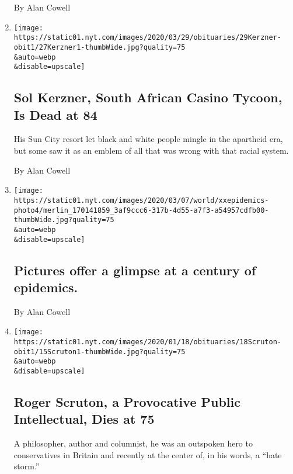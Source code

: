 \begin{enumerate}
  By Alan Cowell
\item
  \href{/2020/03/27/business/sol-kerzner-dead.html}{}

  \texttt{[image: https://static01.nyt.com/images/2020/03/29/obituaries/29Kerzner-obit1/27Kerzner1-thumbWide.jpg?quality=75\\\&auto=webp\\\&disable=upscale]}

  \hypertarget{sol-kerzner-south-african-casino-tycoon-is-dead-at-84}{%
  \subsection{Sol Kerzner, South African Casino Tycoon, Is Dead at
  84}\label{sol-kerzner-south-african-casino-tycoon-is-dead-at-84}}

  His Sun City resort let black and white people mingle in the apartheid
  era, but some saw it as an emblem of all that was wrong with that
  racial system.

  By Alan Cowell
\item
  \href{/live/2020/coronavirus-updates-news-03-23/pictures-offer-a-glimpse-at-a-century-of-epidemics}{}

  \texttt{[image: https://static01.nyt.com/images/2020/03/07/world/xxepidemics-photo4/merlin\_170141859\_3af9ccc6-317b-4d55-a7f3-a54957cdfb00-thumbWide.jpg?quality=75\\\&auto=webp\\\&disable=upscale]}

  \hypertarget{pictures-offer-a-glimpse-at-a-century-of-epidemics}{%
  \subsection{Pictures offer a glimpse at a century of
  epidemics.}\label{pictures-offer-a-glimpse-at-a-century-of-epidemics}}

  By Alan Cowell
\item
  \href{/2020/01/16/books/roger-scruton-dead.html}{}

  \texttt{[image: https://static01.nyt.com/images/2020/01/18/obituaries/18Scruton-obit1/15Scruton1-thumbWide.jpg?quality=75\\\&auto=webp\\\&disable=upscale]}

  \hypertarget{roger-scruton-a-provocative-public-intellectual-dies-at-75}{%
  \subsection{Roger Scruton, a Provocative Public Intellectual, Dies at
  75}\label{roger-scruton-a-provocative-public-intellectual-dies-at-75}}

  A philosopher, author and columnist, he was an outspoken hero to
  conservatives in Britain and recently at the center of, in his words,
  a ``hate storm.''


\end{enumerate}
